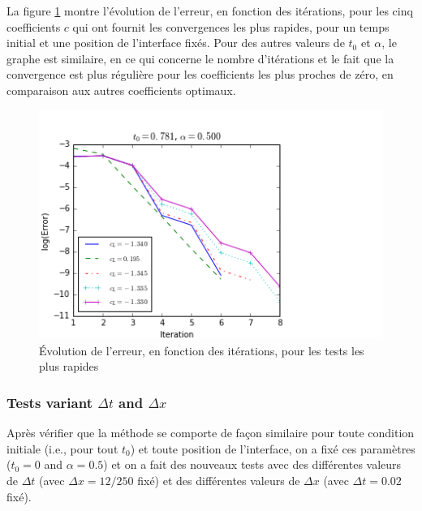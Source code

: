 \endgroup

\indent

\indent La figure \ref{fig:errorEvolution} montre l'évolution de l'erreur, en fonction des itérations, pour les cinq coefficients $c$ qui ont fournit les convergences les plus rapides, pour un temps initial et une position de l'interface fixés. Pour des autres valeurs de $t_0$ et $\alpha$, le graphe est similaire, en ce qui concerne le nombre d'itérations et le fait que la convergence est plus régulière pour les coefficients les plus proches de zéro, en comparaison aux autres coefficients optimaux.

\begin{figure}
\begin{center}
\includegraphics[scale=.5]{figures/FinalFigures/errorEvolutionFixedT0BFinalVersion.png}
\caption{Évolution de l'erreur, en fonction des itérations, pour les tests les plus rapides \label{fig:errorEvolution}}
\end{center}
\end{figure}

\subsubsection{Tests variant $\Delta t$ and $\Delta x$}

\indent Après vérifier que la méthode se comporte de façon similaire pour toute condition initiale (i.e., pour tout $t_0$) et toute position de l'interface, on a fixé ces paramètres ($t_0 = 0$ and $\alpha = 0.5$) et on a fait des nouveaux tests avec des différentes valeurs de $\Delta t$ (avec $\Delta x = 12/250$ fixé) et des différentes valeurs de $\Delta x$ (avec $\Delta t = 0.02$ fixé).

